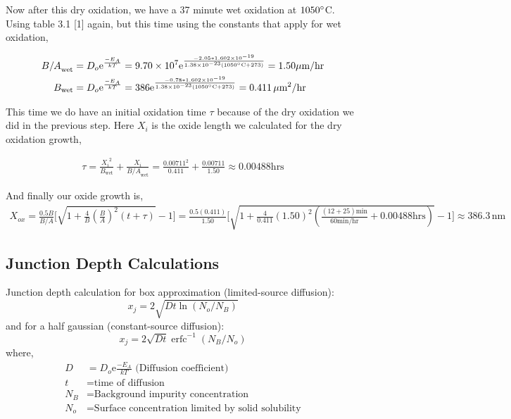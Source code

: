 \documentclass{article}
\newcommand{\me}{\mathrm{e}}
\providecommand{\e}[1]{\ensuremath{\times 10^{#1}}}
\DeclareMathOperator\erfc{erfc}
\begin{document}
Now after this dry oxidation, we have a 37 minute wet oxidation at $1050 \degree$C. Using table 3.1 [1] again, but this time using the constants that apply for wet oxidation,

\begin{align*}
{B/A}_{\text{wet}} &= D_o\me^{\frac{-E_A}{kT}} = 9.70\e{7}\me^{\frac{-2.05*1.602\e{-19}}{1.38\e{-23}(1050\degree\text{C} + 273)}} = 1.50 \mu\text{m/hr} \\
B_{\text{wet}} &= D_o\me^{\frac{-E_A}{kT}} = 386\me^{\frac{-0.78*1.602\e{-19}}{1.38\e{-23}(1050\degree\text{C} + 273)}} = 0.411 \,{\mu\text{m}}^2\text{/hr}
\end{align*}

This time we do have an initial oxidation time $\tau$ because of the dry oxidation we did in the previous step. Here $X_i$ is the oxide length we calculated for the dry oxidation growth,

\begin{align*}
\tau = \frac{{X_i}^2}{B_{\text{wet}}} + \frac{X_i}{{B/A}_{\text{wet}}} = \frac{0.00711^2}{0.411} + \frac{0.00711}{1.50} \approx 0.00488 \text{hrs}
\end{align*}

And finally our oxide growth is,
\begin{align*}
X_{ox} = \frac{0.5B}{B/A}\Big[\sqrt{1 + \frac{4}{B}(\frac{B}{A})^2(t + \tau)} - 1\Big] = \frac{0.5 (0.411)}{1.50}\Big[\sqrt{1 + \frac{4}{0.411}(1.50)^2(\frac{(12 + 25)\text{min}}{60\text{min/hr}} + 0.00488 \text{hrs})} - 1\Big] \approx 386.3 \, \text{nm}
\end{align*}

\subsection{Junction Depth Calculations}
\label{sec:jdepth}
Junction depth calculation for box approximation (limited-source diffusion):
\begin{equation}
x_j = 2\sqrt{Dt \ln{(N_o/N_B)}}
\end{equation}
and for a half gaussian (constant-source diffusion):
\begin{equation}
x_j = 2\sqrt{Dt}\erfc^{-1}{(N_B/N_o)}
\end{equation}
where,
\begin{align*}
D &= D_o\me{\frac{-E_A}{kT}} \,\,\text{(Diffusion coefficient)} \\ 
t &= \text{time of diffusion} \\
N_B &= \text{Background impurity concentration} \\ 
N_o &= \text{Surface concentration limited by solid solubility}
\end{align*}
\end{document}
